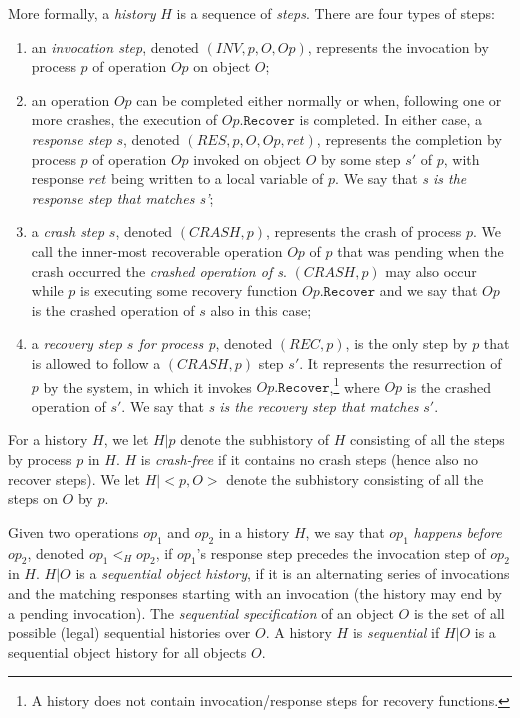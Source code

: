 More formally, a \textit{history} $H$ is a sequence of \emph{steps}.
There are four types of steps:
\begin{enumerate}
	\item an \emph{invocation step}, denoted $(INV, p, O, Op)$, represents the invocation by process $p$ of operation $Op$ on object $O$;
	\item an operation $Op$ can be completed either normally or when, following one or more crashes, the execution of $Op.\texttt{Recover}$ is completed. In either case, a \emph{response step} $s$, denoted $(RES, p, O, Op, ret)$, represents the completion by process $p$ of operation $Op$ invoked on object $O$ by some step $s'$ of $p$, with response $ret$ being written to a local variable of $p$. We say that \emph{s is the response step that matches s'};
	\item a \emph{crash step} $s$, denoted $(CRASH, p)$, represents the crash of process $p$. We call the inner-most recoverable operation $Op$ of $p$ that was pending when the crash occurred the \emph{crashed operation of s}. $(CRASH, p)$ may also occur while $p$ is executing some recovery function $Op.\texttt{Recover}$ and we say that $Op$ is the crashed operation of $s$ also in this case;
	\item a \emph{recovery step $s$ for process p}, denoted $(REC, p)$, is the only step by $p$ that is allowed to follow a $(CRASH, p)$ step $s'$. It represents the resurrection of $p$ by the system, in which it invokes $Op.\texttt{Recover}$,\footnote{A history does not contain invocation/response steps for recovery functions.} where $Op$ is the crashed operation of $s'$.
We say that \emph{s is the recovery step that matches} $s'$.
\end{enumerate}

For a history $H$, we let $H | p$ denote the subhistory of $H$ consisting of all the steps by process $p$ in $H$. 
$H$ is \emph{crash-free} if it contains no crash steps (hence also no recover steps). 
We let $H|{<}p,O{>}$ denote the subhistory consisting of all the steps on $O$ by $p$.

Given two operations $op_1$ and $op_2$ in a history $H$,
we say that $op_1$ \textit{happens before} $op_2$,
denoted $op_1 <_H op_2$,
if $op_1$'s response step precedes the invocation step of $op_2$ in $H$.
$H | O$ is a \emph{sequential object history},
if it is an alternating series of invocations and the matching responses
starting with an invocation (the history may end by a pending invocation).
The \textit{sequential specification} of an object $O$ is the set of all
possible (legal) sequential histories over $O$.
A history $H$ is \emph{sequential} if $H | O$ is a sequential object
history for all objects $O$.

